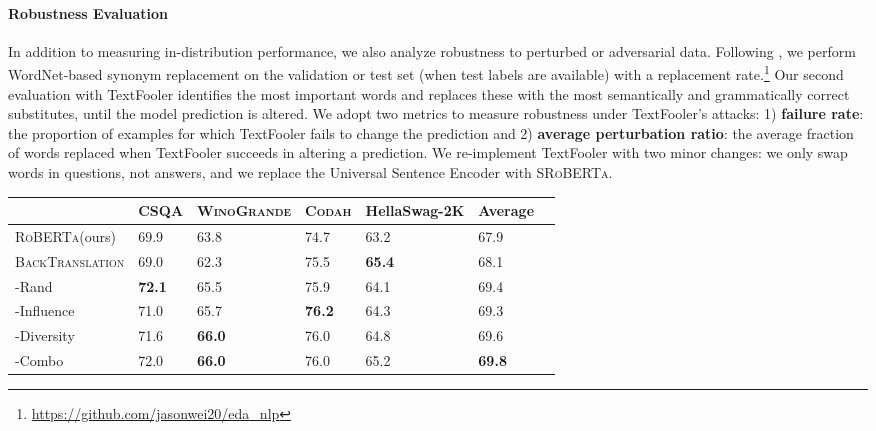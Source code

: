 \documentclass[11pt,a4paper]{article}
\newcommand{\gdaug}{}
\newcommand{\winogrande}{\textsc{WinoGrande}\xspace}
\newcommand{\codah}{\textsc{Codah}\xspace}
\newcommand{\roberta}{\textsc{RoBERTa}\xspace}
\newcommand{\backt}{\textsc{BackTranslation}\xspace}
\begin{document}
\paragraph{Robustness Evaluation}
In addition to measuring in-distribution performance, we also analyze robustness to perturbed or adversarial data.
Following \citet{wei-zou-2019-eda}, we perform WordNet-based \cite{WordNet} synonym replacement on the validation or test set (when test labels are available) with a  replacement rate.\footnote{\url{https://github.com/jasonwei20/eda\_nlp}}
Our second evaluation with TextFooler \cite{jin2019bert}
identifies the most important words and replaces these with the most semantically and grammatically correct substitutes, until the model prediction is altered.
We adopt two metrics to measure robustness under TextFooler's attacks: 1) \textbf{failure rate}: the proportion of examples for which TextFooler fails to change the prediction and 2) \textbf{average perturbation ratio}: the average fraction of words replaced when TextFooler succeeds in altering a prediction. 
We re-implement TextFooler with two minor changes: we only swap words in questions, not answers, and we replace the Universal Sentence Encoder with  S\roberta\cite{Reimers2019SentenceBERTSE}.


\begin{table*}[]
\small
\centering
\begin{tabular}{lllllll}
             & CSQA & \winogrande & \codah & HellaSwag-2K  & \textbf{Average} \\ 
\toprule
\roberta (ours)               & 69.9 & 63.8       & 74.7  & 63.2                 &67.9                 \\ 
\backt     & 69.0   & 62.3       & 75.5  & \textbf{65.4}                 &68.1                  \\ 
\midrule[0.03em]
\gdaug-Rand      & \textbf{72.1} & 65.5       & 75.9  & 64.1                 &69.4                 \\ 
\gdaug-Influence & 71.0   & 65.7       & \textbf{76.2}  & 64.3                 & 69.3                 \\ 
\gdaug-Diversity & 71.6 & \textbf{66.0}       & 76.0  & 64.8                 & 69.6                 \\ 
\gdaug-Combo     & 72.0   & \textbf{66.0}       & 76.0  & 65.2                 & \textbf{69.8}               \\ 
\bottomrule
\end{tabular}
\caption{Results on WordNet-based synonym replacement sets. For \codah and HellaSwag-2K, we perturb test sets, as the labels are available. 
\gdaug-Combo achieves the highest average score. }
\label{syn_res}
\end{table*} 
\end{document}
